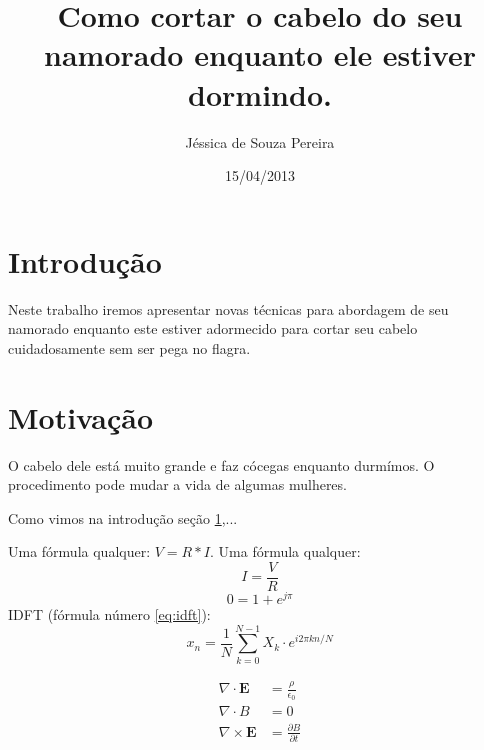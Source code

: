 \documentclass{article}
\author{Jéssica de Souza Pereira}
\date{15/04/2013}
\title{Como cortar o cabelo do seu namorado enquanto ele estiver dormindo.}
\newcommand{\Evet}{\textbf{E}}
\begin{document}
\maketitle
\newpage
\section{Introdução}
\label{sec:intro}
Neste trabalho iremos apresentar novas técnicas para abordagem de seu namorado enquanto este estiver adormecido para cortar seu cabelo cuidadosamente sem ser pega no flagra.
\section{Motivação}
\label{sec:motiv}
O cabelo dele está muito grande e faz cócegas enquanto durmímos. O procedimento pode mudar a vida de algumas mulheres.

Como vimos na introdução {seção \ref{sec:intro}},...

Uma fórmula qualquer: $V = R*I$.
Uma fórmula qualquer: $$I = \frac{V}{R}$$
$$0=1+e^{j\pi}$$
IDFT (fórmula número \ref{eq:idft}):
\begin{equation}
\label{eq:idft}
x_n = \frac{1}{N}\sum_{k = 0}^{N-1} X_k \cdot e^{i2\pi kn/N}
\end{equation}

\begin{align}
\nabla \cdot \textbf{E} & = \frac{\rho}{\epsilon_0} \\
\nabla \cdot B & = 0 \\
\nabla \times \Evet & = \frac{\partial B}{\partial t}
\end{align}
\end{document}
